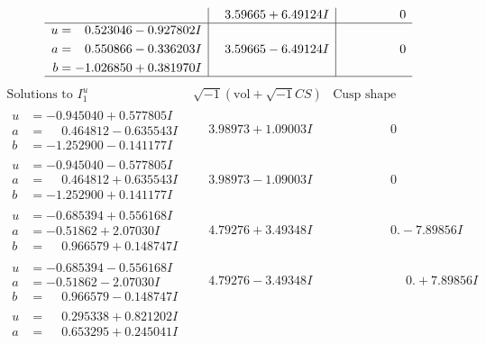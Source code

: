\documentclass[1p]{elsarticle_modified}
\theoremstyle{definition}
\newcommand{\I}{\sqrt{-1}}
\begin{document}
$$\begin{array}{c|c|c}
 & \phantom{-}3.59665 + 6.49124 I & \phantom{-0.000000 } 0 \\ \hline\begin{aligned}
u &= \phantom{-}0.523046 - 0.927802 I \\
a &= \phantom{-}0.550866 - 0.336203 I \\
b &= -1.026850 + 0.381970 I\end{aligned}
 & \phantom{-}3.59665 - 6.49124 I & \phantom{-0.000000 } 0\\
 \hline 
 \end{array}$$\newpage$$\begin{array}{c|c|c}  
\text{Solutions to }I^u_{1}& \I (\text{vol} + \sqrt{-1}CS) & \text{Cusp shape}\\
 \hline 
\begin{aligned}
u &= -0.945040 + 0.577805 I \\
a &= \phantom{-}0.464812 - 0.635543 I \\
b &= -1.252900 - 0.141177 I\end{aligned}
 & \phantom{-}3.98973 + 1.09003 I & \phantom{-0.000000 } 0 \\ \hline\begin{aligned}
u &= -0.945040 - 0.577805 I \\
a &= \phantom{-}0.464812 + 0.635543 I \\
b &= -1.252900 + 0.141177 I\end{aligned}
 & \phantom{-}3.98973 - 1.09003 I & \phantom{-0.000000 } 0 \\ \hline\begin{aligned}
u &= -0.685394 + 0.556168 I \\
a &= -0.51862 + 2.07030 I \\
b &= \phantom{-}0.966579 + 0.148747 I\end{aligned}
 & \phantom{-}4.79276 + 3.49348 I & \phantom{-0.000000 } 0. - 7.89856 I \\ \hline\begin{aligned}
u &= -0.685394 - 0.556168 I \\
a &= -0.51862 - 2.07030 I \\
b &= \phantom{-}0.966579 - 0.148747 I\end{aligned}
 & \phantom{-}4.79276 - 3.49348 I & \phantom{-0.000000 -}0. + 7.89856 I \\ \hline\begin{aligned}
u &= \phantom{-}0.295338 + 0.821202 I \\
a &= \phantom{-}0.653295 + 0.245041 I \\

\end{aligned}
\end{array}$$
\end{document}
